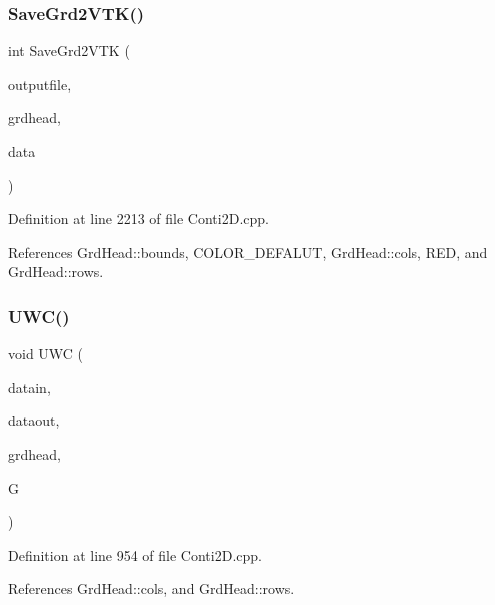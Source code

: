 \subsubsection{Save\+Grd2\+V\+T\+K()}
{\footnotesize\ttfamily int Save\+Grd2\+V\+TK (\begin{DoxyParamCaption}\item[{string}]{outputfile,  }\item[{\textbf{ Grd\+Head}}]{grdhead,  }\item[{double $\ast$}]{data }\end{DoxyParamCaption})}



Definition at line 2213 of file Conti2\+D.\+cpp.



References Grd\+Head\+::bounds, C\+O\+L\+O\+R\+\_\+\+D\+E\+F\+A\+L\+UT, Grd\+Head\+::cols, R\+ED, and Grd\+Head\+::rows.

\mbox{\label{Conti2D_8cpp_a2418639857d09d54494ee0dc5fa8df78_a2418639857d09d54494ee0dc5fa8df78}} 
\subsubsection{U\+W\+C()}
{\footnotesize\ttfamily void U\+WC (\begin{DoxyParamCaption}\item[{double $\ast$}]{datain,  }\item[{double $\ast$}]{dataout,  }\item[{\textbf{ Grd\+Head}}]{grdhead,  }\item[{double $\ast$$\ast$}]{G }\end{DoxyParamCaption})}



Definition at line 954 of file Conti2\+D.\+cpp.



References Grd\+Head\+::cols, and Grd\+Head\+::rows.

\mbox{\label{Conti2D_8cpp_a6e44071dbbec5b92ddf8673dea8c41de_a6e44071dbbec5b92ddf8673dea8c41de}} 
